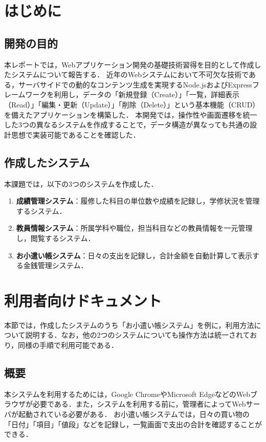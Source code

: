 \section{はじめに}
\subsection{開発の目的}
本レポートでは，Webアプリケーション開発の基礎技術習得を目的として作成したシステムについて報告する．
近年のWebシステムにおいて不可欠な技術である，サーバサイドでの動的なコンテンツ生成を実現するNode.jsおよびExpressフレームワークを利用し，データの「新規登録（Create）」「一覧，詳細表示（Read）」「編集・更新（Update）」「削除（Delete）」という基本機能（CRUD）を備えたアプリケーションを構築した．
本開発では，操作性や画面遷移を統一した3つの異なるシステムを作成することで，データ構造が異なっても共通の設計思想で実装可能であることを確認した．

\subsection{作成したシステム}
本課題では，以下の3つのシステムを作成した．
\begin{enumerate}
    \item \textbf{成績管理システム}：履修した科目の単位数や成績を記録し，学修状況を管理するシステム．
    \item \textbf{教員情報システム}：所属学科や職位，担当科目などの教員情報を一元管理し，閲覧するシステム．
    \item \textbf{お小遣い帳システム}：日々の支出を記録し，合計金額を自動計算して表示する金銭管理システム．
\end{enumerate}



\section{利用者向けドキュメント}
本節では，作成したシステムのうち「お小遣い帳システム」を例に，利用方法について説明する．なお，他の2つのシステムについても操作方法は統一されており，同様の手順で利用可能である．

\subsection{概要}
本システムを利用するためには，Google ChromeやMicrosoft EdgeなどのWebブラウザが必要である．また，システムを利用する前に，管理者によってWebサーバが起動されている必要がある．
お小遣い帳システムでは，日々の買い物の「日付」「項目」「値段」などを記録し，一覧画面で支出の合計を確認することができる．

